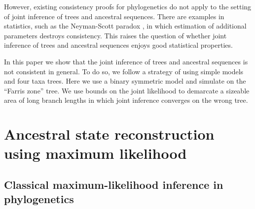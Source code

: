 \documentclass[a4paper]{article}
\begin{document}
However, existing consistency proofs for phylogenetics \cite{RoyChoudhury2015-ta} do not apply to the setting of joint inference of trees and ancestral sequences.
There are examples in statistics, such as the Neyman-Scott paradox \cite{Neyman1948-tt}, in which estimation of additional parameters destroys consistency.
This raises the question of whether joint inference of trees and ancestral sequences enjoys good statistical properties.

In this paper we show that the joint inference of trees and ancestral sequences is not consistent in general.
To do so, we follow a strategy of using simple models and four taxa trees.
Here we use a binary symmetric model and simulate on the ``Farris zone'' \cite{Siddall1998-hq} tree.
We use bounds on the joint likelihood to demarcate a sizeable area of long branch lengths in which joint inference converges on the wrong tree.

\section{Ancestral state reconstruction using maximum likelihood}

\subsection{Classical maximum-likelihood inference in phylogenetics}
\end{document}

